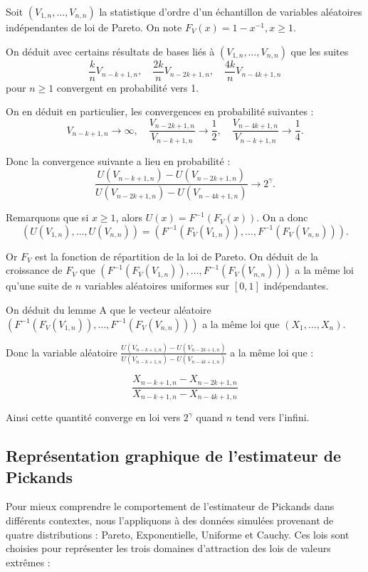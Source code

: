 \documentclass{article}
\theoremstyle{plain}
\theoremstyle{definition}
\theoremstyle{plain}
\begin{document}
Soit $(V_{1,n},\dots,V_{n,n})$ la statistique d’ordre d’un échantillon de variables aléatoires indépendantes de loi de Pareto. On note $F_V(x) = 1 - x^{-1}, x \geq 1$.

On déduit avec certains résultats de bases liés à $(V_{1,n},\dots,V_{n,n})$ que les suites
\[
\frac{k}{n} V_{n-k+1,n}, \quad \frac{2k}{n} V_{n-2k+1,n}, \quad \frac{4k}{n} V_{n-4k+1,n}
\]
pour \(n \geq 1\) convergent en probabilité vers 1.

On en déduit en particulier, les convergences en probabilité suivantes :
\[
V_{n-k+1,n}  \to \infty, \quad \frac{V_{n-2k+1,n}}{V_{n-k+1,n}} \to \frac{1}{2}, \quad \frac{V_{n-4k+1,n}}{V_{n-k+1,n}} \to \frac{1}{4}.
\]

Donc la convergence suivante a lieu en probabilité :
\[
\frac{U(V_{n-k+1,n}) - U(V_{n-2k+1,n})}{U(V_{n-2k+1,n}) - U(V_{n-4k+1,n})} \to 2^{\gamma}.
\]

Remarquons que si $x \geq 1$, alors $U(x) = F^{-1}(F_V(x))$. On a donc
\[
(U(V_{1,n}), \dots, U(V_{n,n})) = (F^{-1}(F_V(V_{1,n})), \dots, F^{-1}(F_V(V_{n,n}))).
\]

Or \(F_V\) est la fonction de répartition de la loi de Pareto. \newline
On déduit de la croissance de $F_V$ que $(F^{-1}(F_V(V_{1,n})),\dots, F^{-1}(F_V(V_{n,n})))$ a la même loi qu’une suite de $n$ variables aléatoires uniformes sur $[0,1]$ indépendantes. 

On déduit du lemme A que le vecteur aléatoire $(F^{-1}(F_V(V_{1,n})),\dots, F^{-1}(F_V(V_{n,n})))$ a la même loi que $(X_1,\dots,X_n)$. 

Donc la variable aléatoire \(\frac{U(V_{n-k+1,n}) - U(V_{n-2k+1,n})}{U(V_{n-k+1,n}) - U(V_{n-4k+1,n})}\) a la même loi que :

\[
\frac{X_{n-k+1,n} - X_{n-2k+1,n}}{X_{n-k+1,n} - X_{n-4k+1,n}}
\]

Ainsi cette quantité converge en loi vers $2^{\gamma}$ quand $n$ tend vers l’infini.

\subsection{Représentation graphique de l’estimateur de Pickands}

Pour mieux comprendre le comportement de l’estimateur de Pickands dans différents contextes, nous l’appliquons à des données simulées provenant de quatre distributions : Pareto, Exponentielle, Uniforme et Cauchy. Ces lois sont choisies pour représenter les trois domaines d’attraction des lois de valeurs extrêmes :
\end{document}
